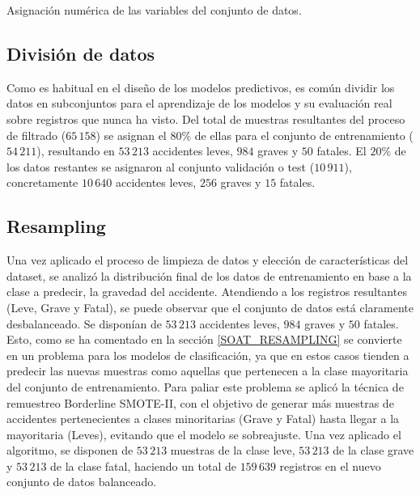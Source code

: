 \documentclass{uathesis-es}
\begin{document}
{\begin{table}[ht]
			\caption{Asignación numérica de las variables del conjunto de datos.}
			\label{TransformacionDatosTabla}
		\end{table}
		
		
		\subsection*{División de datos}
		
		
		Como es habitual en el diseño de los modelos predictivos, es común dividir los datos en subconjuntos para el aprendizaje de los modelos y su evaluación real sobre registros que nunca ha visto. Del total de muestras resultantes del proceso de filtrado ($65\,158$) se asignan el 80\% de ellas para el conjunto de entrenamiento ($54\,211$), resultando en $53\,213$ accidentes leves, $984$ graves y $50$ fatales. El $20\%$ de los datos restantes se asignaron al conjunto validación o test ($10\,911$), concretamente $10\,640$ accidentes leves, $256$ graves y $15$ fatales.
		
		
		\subsection*{Resampling}
		
		Una vez aplicado el proceso de limpieza de datos y elección de características del dataset, se analizó la distribución final de los datos de entrenamiento en base a la clase a predecir, la gravedad del accidente. Atendiendo a los registros resultantes (Leve, Grave y Fatal), se puede observar que el conjunto de datos está claramente desbalanceado. Se disponían de $53\,213$ accidentes leves, $984$ graves y $50$ fatales. Esto, como se ha comentado en la sección \ref{SOAT_RESAMPLING} se convierte en un problema para los modelos de clasificación, ya que en estos casos tienden a predecir las nuevas muestras como aquellas que pertenecen a la clase mayoritaria del conjunto de entrenamiento. Para paliar este problema se aplicó la técnica de remuestreo Borderline SMOTE-II, con el objetivo de generar más muestras de accidentes pertenecientes a clases minoritarias (Grave y Fatal) hasta llegar a la mayoritaria (Leves), evitando que el modelo se sobreajuste. Una vez aplicado el algoritmo, se disponen de $53\,213$ muestras de la clase leve, $53\,213$ de la clase grave y $53\,213$ de la clase fatal, haciendo un total de $159\,639$ registros en el nuevo conjunto de datos balanceado.
		
}
\end{document}
